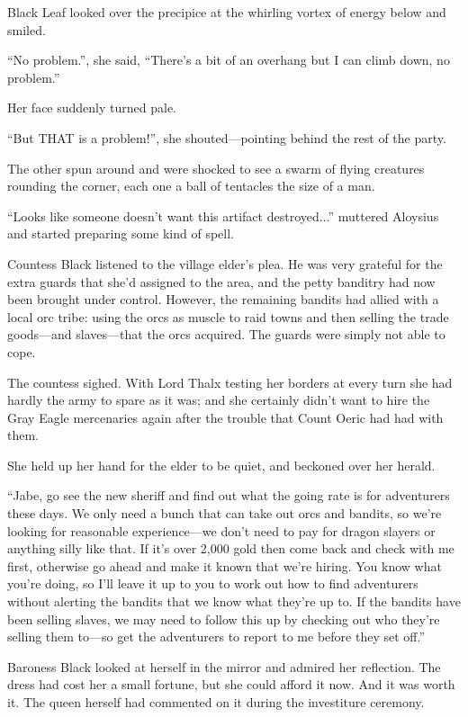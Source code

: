 {Black Leaf looked over the precipice at the whirling vortex of energy below and smiled.

“No problem.”, she said, “There’s a bit of an overhang but I can climb down, no problem.”

Her face suddenly turned pale.

“But THAT is a problem!”, she shouted—pointing behind the rest of the party.

The other spun around and were shocked to see a swarm of flying creatures rounding the corner, each one a ball of tentacles the size of a man.

“Looks like someone doesn’t want this artifact destroyed...” muttered Aloysius and started preparing some kind of spell.

Countess Black listened to the village elder’s plea. He was very grateful for the extra guards that she’d assigned to the area, and the petty banditry had now been brought under control. However, the remaining bandits had allied with a local orc tribe: using the orcs as muscle to raid towns and then selling the trade goods—and slaves—that the orcs acquired. The guards were simply not able to cope.

The countess sighed. With Lord Thalx testing her borders at every turn she had hardly the army to spare as it was; and she certainly didn’t want to hire the Gray Eagle mercenaries again after the trouble that Count Oeric had had with them.

She held up her hand for the elder to be quiet, and beckoned over her herald.

“Jabe, go see the new sheriff and find out what the going rate is for adventurers these days. We only need a bunch that can take out orcs and bandits, so we’re looking for reasonable experience—we don’t need to pay for dragon slayers or anything silly like that. If it’s over 2,000 gold then come back and check with me first, otherwise go ahead and make it known that we’re hiring. You know what you’re doing, so I’ll leave it up to you to work out how to find adventurers without alerting the bandits that we know what they’re up to. If the bandits have been selling slaves, we may need to follow this up by checking out who they’re selling them to—so get the adventurers to report to me before they set off.”

Baroness Black looked at herself in the mirror and admired her reflection. The dress had cost her a small fortune, but she could afford it now. And it was worth it. The queen herself had commented on it during the investiture ceremony.

}
